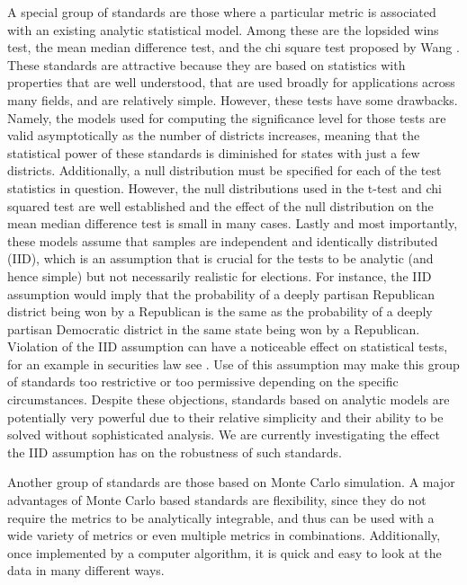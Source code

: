 \documentclass[preprint,12pt]{article}
\begin{document}
A special group of standards are those where a particular metric is associated with an existing analytic statistical model.
Among these are the lopsided wins test, the mean median difference test, and the chi square test proposed by Wang \cite{Wang__,Wang_2016_10.1089/elj.2016.0387}.
These standards are attractive because they are based on statistics with properties that are well understood, that are used broadly for applications across many fields, and are relatively simple.
However, these tests have some drawbacks.
Namely, the models used for computing the significance level for those tests are valid asymptotically as the number of districts increases, meaning that the statistical power of these standards is diminished for states with just a few districts.
Additionally, a null distribution must be specified for each of the test statistics in question. 
However, the null distributions used in the t-test and chi squared test are well established and the effect of the null distribution on the mean median difference test is small in many cases. \cite{Cabilio_1996_10.2307/3315744,Zheng_2010_}
Lastly and most importantly, these models assume that samples are independent and identically distributed (IID), which is an assumption that is crucial for the tests to be analytic (and hence simple) but not necessarily realistic for elections.
For instance, the IID assumption would imply that the probability of a deeply partisan Republican district being won by a Republican is the same as the probability of a deeply partisan Democratic district in the same state being won by a Republican.
Violation of the IID assumption can have a noticeable effect on statistical tests, for an example in securities law see \cite{Gel_2009_10.1093/lpr/mgp008}. 
Use of this assumption may make this group of standards too restrictive or too permissive depending on the specific circumstances.
Despite these objections, standards based on analytic models are potentially very powerful due to their relative simplicity and their ability to be solved without sophisticated analysis.
We are currently investigating the effect the IID assumption has on the robustness of such standards.

Another group of standards are those based on Monte Carlo simulation.
A major advantages of Monte Carlo based standards are flexibility, since they do not require the metrics to be analytically integrable, and thus can be used with a wide variety of metrics or even multiple metrics in combinations.
Additionally, once implemented by a computer algorithm, it is quick and easy to look at the data in many different ways.
\end{document}
